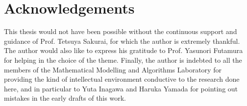 \chapter*{Acknowledgements}
This thesis would not have been possible without the continuous support and guidance of Prof. Tetsuya Sakurai, for which the author is extremely thankful.
The author would also like to express his gratitude to Prof. Yasunori Futamura for helping in the choice of the theme. 
Finally, the author is indebted to all the members of the Mathematical Modelling and Algorithms Laboratory for providing the kind of intellectual environment conductive to the research done here, and in particular to Yuta Inagawa and Haruka Yamada for pointing out mistakes in the early drafts of this work.

\newpage

\renewcommand{\bibname}{References}


{}



